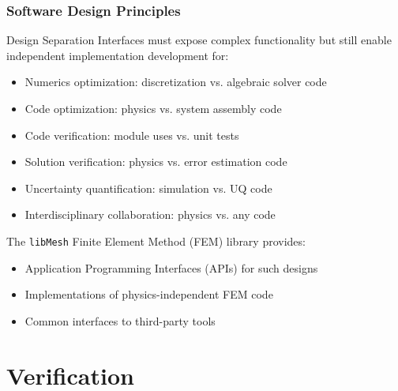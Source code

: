 \documentclass[mathserif]{beamer}
\newcommand{\software}[1]{\texttt{#1}}
\newcommand{\libMesh}{\software{libMesh}}
\newcommand{\CVer}[1]{#1}
\newcommand{\CUQ}[1]{#1}
\newcommand{\CInt}[1]{#1}
\newcommand{\CExa}[1]{#1}
\begin{document}
\begin{frame}
\frametitle{Software Design Principles}
\begin{block}{Design Separation}
Interfaces must expose complex functionality but still enable
independent implementation development for:
\begin{itemize}
\item \CExa{Numerics optimization}: discretization vs. algebraic solver code
\item \CExa{Code optimization}: physics vs. system assembly code
\item \CVer{Code verification}: module uses vs. unit tests
\item \CVer{Solution verification}: physics vs. error estimation code
\item \CUQ{Uncertainty quantification}: simulation vs. UQ code
\item \CInt{Interdisciplinary collaboration}: physics vs. any code
\end{itemize}
\end{block}

The \libMesh{} Finite Element Method (FEM) library provides:
\begin{itemize}
	\item Application Programming Interfaces (APIs) for such designs
	\item Implementations of physics-independent FEM code
	\item Common interfaces to third-party tools
\end{itemize}

\end{frame}



\section{Verification}
\end{document}
